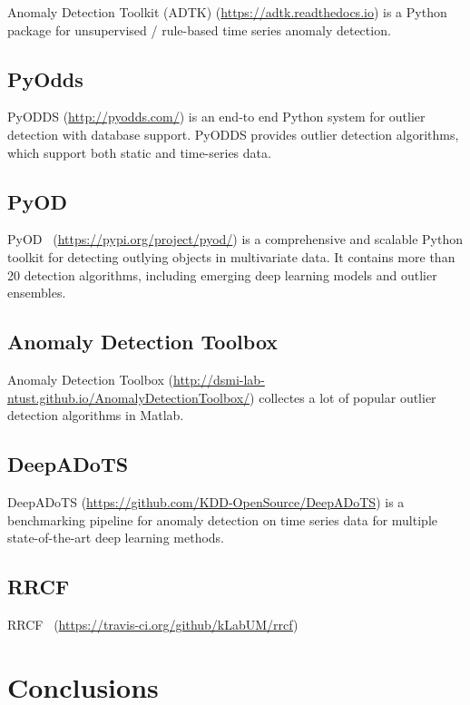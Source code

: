 Anomaly Detection Toolkit (ADTK) (\href{https://adtk.readthedocs.io}{https://adtk.readthedocs.io}) is a Python package for
unsupervised / rule-based time series anomaly detection.

\subsection{PyOdds}

PyODDS (\href{http://pyodds.com/}{http://pyodds.com/}) is an end-to end Python system for
outlier detection with database support.
PyODDS provides outlier detection algorithms,
which support both static and time-series data.

\subsection{PyOD}

PyOD~\cite{zhao2019pyod} (\href{https://pypi.org/project/pyod/}{https://pypi.org/project/pyod/})
is a comprehensive and scalable Python toolkit for
detecting outlying objects in multivariate data.
It contains more than 20 detection algorithms,
including emerging deep learning models and
outlier ensembles.

\subsection{Anomaly Detection Toolbox}

Anomaly Detection Toolbox
(\href{http://dsmi-lab-ntust.github.io/AnomalyDetectionToolbox/}{http://dsmi-lab-ntust.github.io/AnomalyDetectionToolbox/})
collectes a lot of popular outlier detection algorithms in Matlab.

\subsection{DeepADoTS}

DeepADoTS (\href{https://github.com/KDD-OpenSource/DeepADoTS}{https://github.com/KDD-OpenSource/DeepADoTS})
is a benchmarking pipeline for anomaly detection on
time series data for
multiple state-of-the-art deep learning methods.

\subsection{RRCF}

RRCF~\cite{bartos_2019_rrcf} (\href{https://travis-ci.org/github/kLabUM/rrcf}{https://travis-ci.org/github/kLabUM/rrcf})



\section{Conclusions} \label{sec-conclusions}






